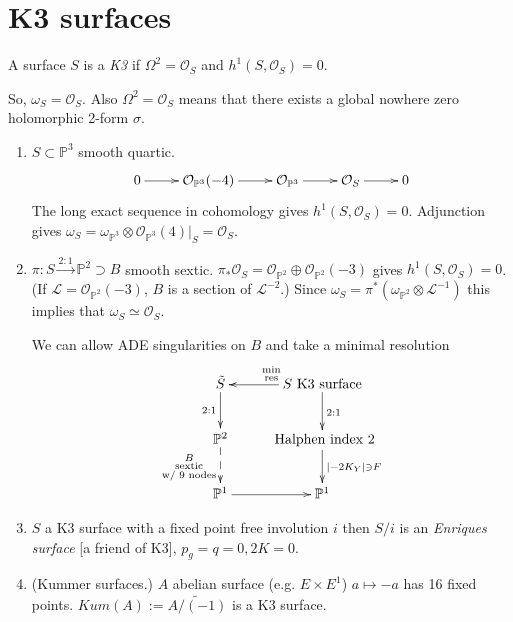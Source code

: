 \section{K3 surfaces}
\label{section-k3}

\begin{definition}
\label{definition-k3}
A surface $S$ is a {\it K3} if
$\Omega^2=\mathcal{O}_S$ and
$h^1(S,\mathcal{O}_S)=0$.
\end{definition}

\noindent
So, $\omega_S=\mathcal{O}_S$.
Also $\Omega^2=\mathcal{O}_S$ means that
there exists
a global nowhere zero holomorphic 2-form
$\sigma$.

\begin{example}
\label{example-k3}
\begin{enumerate}
\item $S \subset \mathbb{P}^3$ smooth
quartic.
$$
\xymatrix{
0\ar[r]
&\mathcal{O}_{\mathbb{P}^3}(-4)\ar[r]
&\mathcal{O}_{\mathbb{P}^3}\ar[r]
&\mathcal{O}_S\ar[r]
&0
}
$$
The long exact sequence in cohomology
gives $h^1(S,\mathcal{O}_S)=0$.
Adjunction gives
$\omega_S=\omega_{\mathbb{P}^3}
\otimes\mathcal{O}_{\mathbb{P}^3}(4)|_S
=\mathcal{O}_S$.

\item $\pi:S \xrightarrow{2:1}\mathbb{P}^2
\supset B$
smooth sextic.
$\pi_*\mathcal{O}_S
=\mathcal{O}_{\mathbb{P}^2}\oplus\mathcal{O}
_{\mathbb{P}^2}(-3)$
gives $h^1(S,\mathcal{O}_S)=0$.
(If
$\mathcal{L}=\mathcal{O}_{\mathbb{P}^2}(-3)$,
$B$ is a section of $\mathcal{L}^{-2}$.)
Since $\omega_S=\pi^*
(\omega_{\mathbb{P}^2}\otimes\mathcal{L}^{-1})$
this implies that $\omega_S \simeq
\mathcal{O}_S$.
\begin{remark}
\label{remark-ade-singularities-on-k3}
We can allow ADE singularities on $B$ and
take a minimal resolution
$$
\xymatrix{
\tilde{S}\ar[d]_-{2:1}&S\text{ K3
surface}\ar[d]^{2:1}
\ar[l]_{\substack{ \text{min}\\\text{res}
}}\\
\mathbb{P}^2\ar@{-->}[d]_{\substack{B \\
\text{sextic}\\
\text{w/ 9 nodes}}}& \text{ Halphen index
2}\ar[d]^{|-2K_Y|\ni F}\\
\mathbb{P}^1\ar[r]&\mathbb{P}^1
}
$$
\end{remark}

\item $S$ a K3 surface with a fixed point
free involution $i$
then $S/i$ is an {\it Enriques surface} [a
friend of K3],
$p_g=q=0,2K=0$.

\item (Kummer surfaces.) $A$ abelian surface
(e.g. $E \times E^1$)
$a \mapsto  -a$ has 16 fixed points.
$Kum(A):=\widetilde{A/(-1)}$ is a K3 surface.
\end{enumerate}
\end{example}

